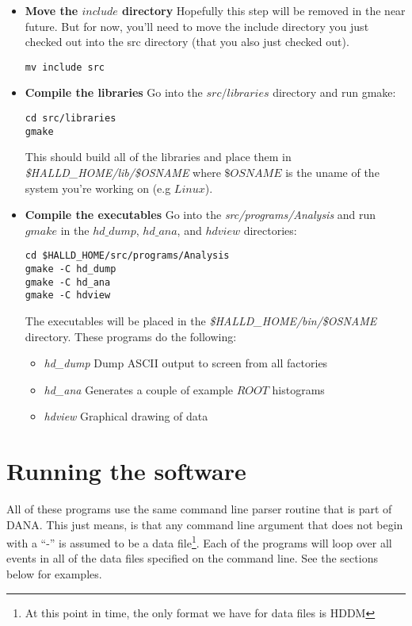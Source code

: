 \documentclass[12pt]{article}
\begin{document}
\begin{itemize}
	\item{\bf Move the $include$ directory} Hopefully this step will be
	removed in the near future. But for now, you'll need to move the
	include directory you just checked out into the src directory
	(that you also just checked out).

		\begin{lstlisting}[frame=shadowbox,backgroundcolor=\color{cmdbkgd}]
mv include src
		\end{lstlisting}
	
	\item{\bf Compile the libraries} Go into the $src/libraries$ directory
	and run gmake:

		\begin{lstlisting}[frame=shadowbox,backgroundcolor=\color{cmdbkgd}]
cd src/libraries
gmake
		\end{lstlisting}

	This should build all of the libraries and place them in
	{\it \$HALLD\_HOME/lib/\$OSNAME} where $\$OSNAME$ is the uname of
	the system you're working on (e.g $Linux$).

	\item{\bf Compile the executables} Go into the {\it src/programs/Analysis}
	and run $gmake$ in the $hd\_dump$, $hd\_ana$, and $hdview$ directories:

		\begin{lstlisting}[frame=shadowbox,backgroundcolor=\color{cmdbkgd}]
cd $HALLD_HOME/src/programs/Analysis
gmake -C hd_dump
gmake -C hd_ana
gmake -C hdview
		\end{lstlisting}
		
	The executables will be placed in the {\it \$HALLD\_HOME/bin/\$OSNAME}
	directory. These programs do the following:
	\begin{itemize}
		\item{\it hd\_dump} Dump ASCII output to screen from all factories
		\item{\it hd\_ana} Generates a couple of example $ROOT$ histograms
		\item{\it hdview} Graphical drawing of data
	\end{itemize}
	
\end{itemize}

\section{Running the software}
All of these programs use the same command line parser routine
that is part of DANA. This just means, is that any command
line argument that does not begin with a ``-'' is assumed to be 
a data file\footnote{At this point in time, the only format we have
for data files is HDDM}. Each of the programs will loop over
all events in all of the data files specified on the command line.
See the sections below for examples.
\end{document}
